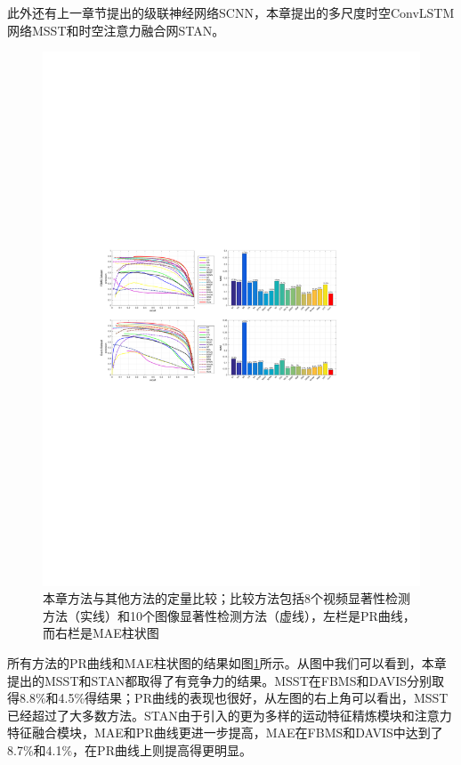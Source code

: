 此外还有上一章节提出的级联神经网络SCNN，本章提出的多尺度时空ConvLSTM网络MSST和时空注意力融合网STAN。

\begin{figure}
\centering
\includegraphics[width=1\textwidth]{figures/methos_compare_new3}
\caption{本章方法与其他方法的定量比较；比较方法包括8个视频显著性检测方法（实线）和10个图像显著性检测方法（虚线），左栏是PR曲线，而右栏是MAE柱状图}
\label{figure4}
\end{figure}

所有方法的PR曲线和MAE柱状图的结果如图\ref{figure4}所示。从图中我们可以看到，本章提出的MSST和STAN都取得了有竞争力的结果。MSST在FBMS和DAVIS分别取得8.8\%和4.5\%得结果；PR曲线的表现也很好，从左图的右上角可以看出，MSST已经超过了大多数方法。STAN由于引入的更为多样的运动特征精炼模块和注意力特征融合模块，MAE和PR曲线更进一步提高，MAE在FBMS和DAVIS中达到了8.7\%和4.1\%，在PR曲线上则提高得更明显。

